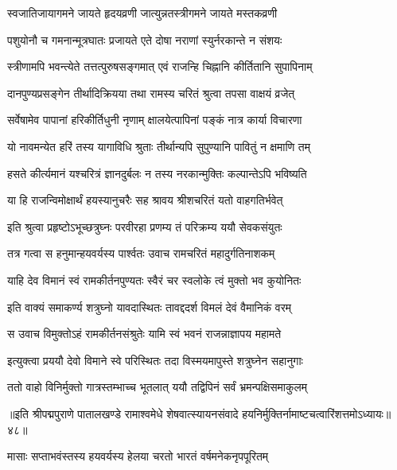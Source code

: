 \twolineshloka
{स्वजातिजायागमने जायते हृदयव्रणी}
{जात्युन्नतस्त्रीगमने जायते मस्तकव्रणी}%

\twolineshloka
{पशुयोनौ च गमनान्मूत्रघातः प्रजायते}
{एते दोषा नराणां स्युर्नरकान्ते न संशयः}%

\twolineshloka
{स्त्रीणामपि भवन्त्येते तत्तत्पुरुषसङ्गमात्}
{एवं राजन्हि चिह्नानि कीर्तितानि सुपापिनाम्}%

\twolineshloka
{दानपुण्यप्रसङ्गेन तीर्थादिक्रियया तथा}
{रामस्य चरितं श्रुत्वा तपसा वाक्षयं व्रजेत्}%

\twolineshloka
{सर्वेषामेव पापानां हरिकीर्तिधुनी नृणाम्}
{क्षालयेत्पापिनां पङ्कं नात्र कार्या विचारणा}%

\twolineshloka
{यो नावमन्येत हरिं तस्य यागाविधि श्रुताः}
{तीर्थान्यपि सुपुण्यानि पावितुं न क्षमाणि तम्}%

\twolineshloka
{हसते कीर्त्यमानं यश्चरित्रं ज्ञानदुर्बलः}
{न तस्य नरकान्मुक्तिः कल्पान्तेऽपि भविष्यति}%

\twolineshloka
{या हि राजन्विमोक्षार्थं हयस्यानुचरैः सह}
{श्रावय श्रीशचरितं यतो वाहगतिर्भवेत्}%


\twolineshloka
{इति श्रुत्वा प्रहृष्टोऽभूच्छत्रुघ्नः परवीरहा}
{प्रणम्य तं परिक्रम्य ययौ सेवकसंयुतः}%

\twolineshloka
{तत्र गत्वा स हनुमान्हयवर्यस्य पार्श्वतः}
{उवाच रामचरितं महादुर्गतिनाशकम्}%

\twolineshloka
{याहि देव विमानं स्वं रामकीर्तनपुण्यतः}
{स्वैरं चर स्वलोके त्वं मुक्तो भव कुयोनितः}%

\twolineshloka
{इति वाक्यं समाकर्ण्य शत्रुघ्नो यावदास्थितः}
{तावद्ददर्श विमलं देवं वैमानिकं वरम्}%

\twolineshloka
{स उवाच विमुक्तोऽहं रामकीर्तनसंश्रुतेः}
{यामि स्वं भवनं राजन्नाज्ञापय महामते}%

\twolineshloka
{इत्युक्त्वा प्रययौ देवो विमाने स्वे परिस्थितः}
{तदा विस्मयमापुस्ते शत्रुघ्नेन सहानुगाः}%

\twolineshloka
{ततो वाहो विनिर्मुक्तो गात्रस्तम्भाच्च भूतलात्}
{ययौ तद्विपिनं सर्वं भ्रमन्पक्षिसमाकुलम्}%

{॥इति श्रीपद्मपुराणे पातालखण्डे रामाश्वमेधे शेषवात्स्यायनसंवादे हयनिर्मुक्तिर्नामाष्टचत्वारिंशत्तमोऽध्यायः॥४८॥}



\twolineshloka
{मासाः सप्ताभवंस्तस्य हयवर्यस्य हेलया}
{चरतो भारतं वर्षमनेकनृपपूरितम्}%

